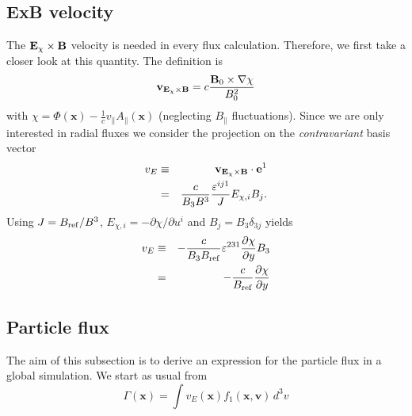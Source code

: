 \subsection{{\bf ExB} velocity}
The ${\bf E_\chi\times B}$ velocity is needed in every flux calculation. 
Therefore, we first take a closer look at this quantity. The definition is 
\begin{displaymath}
\mathbf{v}_{\bf E_\chi\times B} = c\frac{\mathbf{B}_0\times\nabla\chi}{B_0^2}
\end{displaymath}
with $\chi = \Phi(\mathbf{x})-\frac{1}{c}v_\parallel A_\parallel(\mathbf{x})$ 
(neglecting $B_\parallel$ fluctuations). Since we are only interested in
radial fluxes we consider the projection on the {\em contravariant} basis 
vector
\begin{eqnarray*}
v_E & \equiv & \mathbf{v}_{\bf E_\chi\times B}\cdot \mathbf{e}^1 \\
& = & \frac{c}{B_3 B^3}\frac{\varepsilon^{ij1}}{J} E_{\chi,i} B_j.
\end{eqnarray*}
Using $J=B_{\rm ref}/B^3$, $E_{\chi,i}=-\partial\chi/\partial u^i$ and $B_j=B_3\delta_{3j}$
yields
\begin{eqnarray*}
v_E & \equiv & -\frac{c}{B_3 B_{\mathrm{ref}}} \varepsilon^{231} \frac{\partial\chi}{\partial y} B_3\\
 & = & - \frac{c}{B_{\mathrm{ref}}} \frac{\partial\chi }{\partial y}
\end{eqnarray*}



\subsection{Particle flux}
\label{sec:partflux}

The aim of this subsection is to derive an expression for the particle
flux in a global simulation. We start as usual from
\begin{displaymath}
  \Gamma(\mathbf{x})=\int v_E(\mathbf{x})f_1(\mathbf{x},\mathbf{v})\,d^3v
\end{displaymath}

